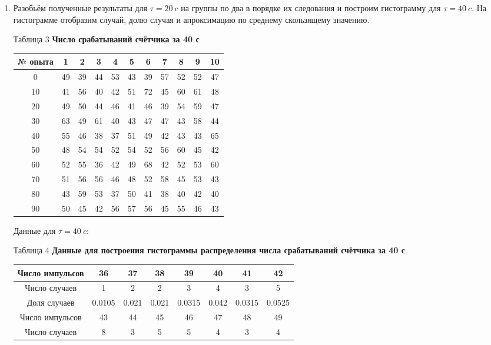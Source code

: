 \documentclass[a4paper, 12pt]{article}
\begin{document}
\begin{enumerate}
		\item Разобьём полученные результаты для $\tau = 20 \: c$ на группы по два в порядке их следования и построим гистограмму для $\tau = 40 \: c$. На гистограмме отобразим случай, долю случая и апроксимацию по среднему скользящему значению.
		\begin{center}
                Таблица 3
                \textbf{Число срабатываний счётчика за 40 с}
			\begin{tabular}{|c|c|c|c|c|c|c|c|c|c|c|}
				\hline
				№ опыта & 1 & 2 & 3 & 4 & 5 & 6 & 7 & 8 & 9 & 10\\ \hline
				0 & 49 & 39 & 44 & 53 & 43 &  39 & 57 & 52 & 52 & 47\\ \hline 
				10 & 41 & 56 & 40 & 42 & 51 & 72 & 45 & 60 & 61 & 48\\ \hline 
				20 & 49 & 50 & 44 & 46 & 41 & 46 & 39 & 54 & 59 & 47\\ \hline 
				30 & 63 & 49 & 61 & 40 & 43 & 47 & 47 & 43 & 58 & 44\\ \hline 
				40 & 55 & 46 & 38 & 37 & 51 & 49 & 42 & 43 & 43 & 65\\ \hline 
				50 & 48 & 54 & 54 & 52 & 54 & 52 & 56 & 60 & 45 & 42\\ \hline 
				60 & 52 & 55 & 36 & 42 & 49 & 68 & 42 & 52 & 53 & 60\\ \hline 
				70 & 51 & 56 & 56 & 46 & 48 & 52 & 58 & 45 & 53 & 43\\ \hline 
				80 & 43 & 59 & 53 & 37 & 50 & 41 & 38 & 40 & 42 & 40\\ \hline 
				90 & 50 & 45 & 42 & 56 & 57 & 56 & 45 & 55 & 46 & 43\\ \hline 
			\end{tabular}
		\end{center}
		Данные для $\tau = 40\ c$:
		\begin{center}
                Таблица 4
                \textbf{Данные для построения гистограммы распределения числа срабатываний счётчика за 40 с}
			\begin{tabular}{|c|c|c|c|c|c|c|c|}
				\hline
				Число импульсов & 36 & 37 & 38 & 39 & 40 & 41 & 42\\
				\hline
				Число случаев & 1 & 2 & 2 & 3 & 4 & 3 & 5\\
				\hline
				Доля случаев & 0.0105 & 0.021 & 0.021 & 0.0315 & 0.042 & 0.0315 & 0.0525\\
				\hline \cline{1-8}
				Число импульсов & 43 & 44 & 45  & 46 & 47 & 48 & 49\\
				\hline
				Число случаев & 8 & 3 & 5 & 5 & 4 & 3 & 4\\

\end{tabular}
\end{center}
\end{enumerate}
\end{document}
